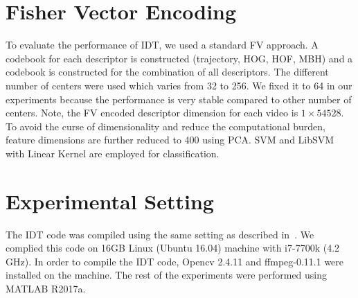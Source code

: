 \section{Fisher Vector Encoding}
To evaluate the performance of IDT, we used a standard FV approach. A codebook for each descriptor is constructed (trajectory, HOG, HOF, MBH) and a codebook is constructed for the combination of all descriptors. The different number of centers were used which varies from 32 to 256. We fixed it to 64 in our experiments because the performance is very stable compared to other number of centers. 
Note, the FV encoded descriptor dimension for each video is  $1 \times 54528$. To avoid the curse of dimensionality and reduce the computational burden, feature dimensions are further reduced to 400 using PCA. SVM and LibSVM with Linear Kernel are employed for classification.

\section{Experimental Setting}
The IDT code was compiled using the same setting as described in~\cite{HengWang:2011:ARD:2191740.2192078}. We complied this code on 16GB Linux (Ubuntu 16.04) machine with i7-7700k (4.2 GHz). In order to compile the IDT code, Opencv 2.4.11 and ffmpeg-0.11.1 were installed on the machine. The rest of the experiments were performed using MATLAB R2017a. 









